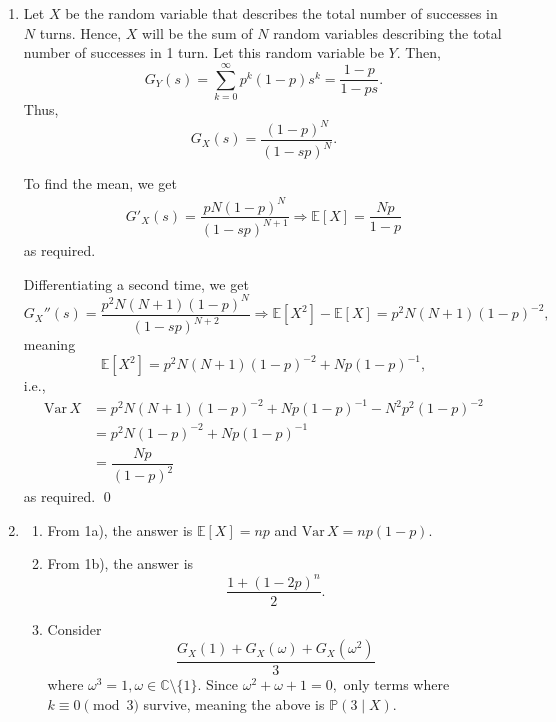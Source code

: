 \documentclass[12p]{article}
\begin{document}
\begin{enumerate}
  \item Let $X$ be the random variable that describes the total
    number of successes in $N$ turns. Hence, $X$ will be the sum of
    $N$ random variables describing the total number of successes in
    1 turn. Let this random variable be $Y.$ Then,
    $$
    G_Y(s) = \sum_{k = 0}^{\infty} p^{k} (1-p) s^{k} = \dfrac{1-p}{1-ps}.
    $$
    Thus, $$G_X(s) = \dfrac{(1-p)^N}{(1-sp)^N}.$$

    To find the mean, we get
    \begin{align*}
      G'_X(s) = \dfrac{pN(1-p)^{N}}{(1-sp)^{N + 1}} \Rightarrow
      \mathbb E[X] = \dfrac{Np}{1-p}
    \end{align*}
    as required.

    Differentiating a second time, we get
    $$
    G_X''(s) = \dfrac{p^2N(N+1)(1-p)^{N}}{(1-sp)^{N+2}} \Rightarrow
    \mathbb E[X^2] - \mathbb E[X] =  p^2 N(N+1) (1-p)^{-2},
    $$
    meaning
    $$
    \mathbb E[X^2] = p^2N(N+1) (1-p)^{-2} + Np(1-p)^{-1},
    $$
    i.e.,
    \begin{align*}
      \text{Var}\, X &= p^2N(N+1)(1-p)^{-2} + Np(1-p)^{-1} - N^2p^2(1-p)^{-2} \\
      &= p^2N(1-p)^{-2} + Np(1-p)^{-1} \\
      &= \dfrac{Np}{(1-p)^2}
    \end{align*}
    as required. \qed

  \item
    \begin{enumerate}
    \item From 1a), the answer is $\mathbb E[X] = np$ and
      $\text{Var}\, X = np(1-p).$
  \item From 1b), the answer is
    $$
    \dfrac{1 + (1-2p)^{n}}{2}.
    $$
  \item Consider
    $$
    \dfrac{G_X(1) + G_X(\omega) + G_X(\omega^2)}{3}
    $$
    where $\omega^3 = 1, \omega \in \mathbb C \setminus \{1\}.$ Since
    $\omega^2 + \omega + 1 = 0,$ only terms where $k \equiv 0 \pmod
    3$ survive, meaning the above is $\mathbb P(3 \mid X).$


\end{enumerate}
\end{enumerate}
\end{document}
